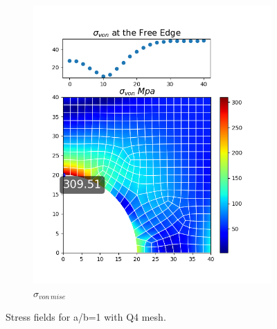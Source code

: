 \documentclass[twoside,twocolumn,10pt]{article}
\begin{document}
\begin{figure}[!ht]
\begin{subfigure}[c]{0.26\textwidth}
    \includegraphics[width=1.\linewidth]{Q2_5/Q5_1_von_quad.png}
    \caption{$\sigma_{von \, mise}$}
    \label{fig:von_quad}
  \end{subfigure}
  \caption{Stress fields for a/b=1 with Q4 mesh.}
  \label{fig:quad_1}
\end{figure}
\end{document}
